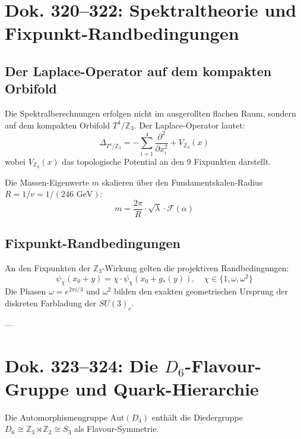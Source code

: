 \documentclass[11pt,a4paper]{article}
\begin{document}
	\section{Dok. 320--322: Spektraltheorie und Fixpunkt-Randbedingungen}
	
	\subsection{Der Laplace-Operator auf dem kompakten Orbifold}
	Die Spektralberechnungen erfolgen nicht im ausgerollten flachen Raum, sondern auf dem kompakten Orbifold $T^4/\mathbb{Z}_3$. Der Laplace-Operator lautet:
	\begin{equation}
		\Delta_{T^4/\mathbb{Z}_3} = -\sum_{i=1}^4 \frac{\partial^2}{\partial x_i^2} + V_{\mathbb{Z}_3}(x)
	\end{equation}
	wobei $V_{\mathbb{Z}_3}(x)$ das topologische Potential an den 9 Fixpunkten darstellt.
	
	Die Massen-Eigenwerte $m$ skalieren über den Fundamentskalen-Radius $R = 1/v = 1/(246\text{ GeV})$:
	\begin{equation}
		m = \frac{2\pi}{R} \cdot \sqrt{\lambda} \cdot \mathcal{F}(\alpha)
	\end{equation}
	
	\subsection{Fixpunkt-Randbedingungen}
	An den Fixpunkten der $\mathbb{Z}_3$-Wirkung gelten die projektiven Randbedingungen:
	\begin{equation}
		\psi_{\chi}(x_0 + y) = \chi \cdot \psi_{\chi}(x_0 + g_*(y)), \quad \chi \in \{1, \omega, \omega^2\}
	\end{equation}
	Die Phasen $\omega = e^{2\pi i / 3}$ und $\omega^2$ bilden den exakten geometrischen Ursprung der diskreten Farbladung der $SU(3)_c$.
	
	---
	
	\section{Dok. 323--324: Die \texorpdfstring{$D_6$}{D6}-Flavour-Gruppe und Quark-Hierarchie}
	
	Die Automorphismengruppe $\text{Aut}(D_4)$ enthält die Diedergruppe $D_6 \cong \mathbb{Z}_3 \rtimes \mathbb{Z}_2 \cong S_3$ als Flavour-Symmetrie.
	
\end{document}
